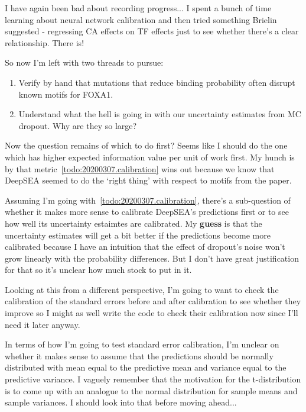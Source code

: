 \begin{Minutes}{}
\maketitle
{}
I have again been bad about recording progress... I spent a bunch of time learning about neural network calibration and then tried something Brielin suggested - regressing CA effects on TF effects just to see whether there's a clear relationship. There is!

So now I'm left with two threads to pursue:
\begin{enumerate}
    \item Verify by hand that mutations that reduce binding probability often disrupt known motifs for FOXA1. \label{todo:20200307.motif}
    \item Understand what the hell is going in with our uncertainty estimates from MC dropout. Why are they so large? \label{todo:20200307.calibration}
\end{enumerate}

Now the question remains of which to do first? Seems like I should do the one which has higher expected information value per unit of work first. My hunch is by that metric~\ref{todo:20200307.calibration} wins out because we know that DeepSEA seemed to do the `right thing' with respect to motifs from the paper.

Assuming I'm going with~\ref{todo:20200307.calibration}, there's a sub-question of whether it makes more sense to calibrate DeepSEA's predictions first or to see how well its uncertainty estaimtes are calibrated. My \textbf{guess} is that the uncertainty estimates will get a bit better if the predictions become more calibrated because I have an intuition that the effect of dropout's noise won't grow linearly with the probability differences. But I don't have great justification for that so it's unclear how much stock to put in it.

Looking at this from a different perspective, I'm going to want to check the calibration of the standard errors before and after calibration to see whether they improve so I might as well write the code to check their calibration now since I'll need it later anyway.

In terms of how I'm going to test standard error calibration, I'm unclear on whether it makes sense to assume that the predictions should be normally distributed with mean equal to the predictive mean and variance equal to the predictive variance. I vaguely remember that the motivation for the t-distribution is to come up with an analogue to the normal distribution for sample means and sample variances. I should look into that before moving ahead...


\end{Minutes}
